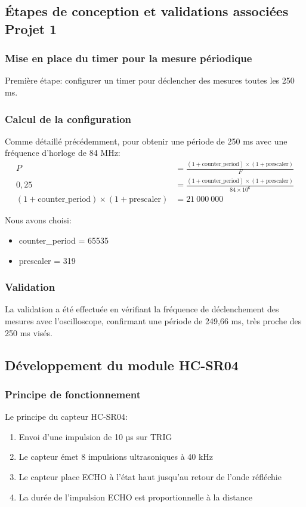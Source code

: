 \subsection{Étapes de conception et validations associées Projet 1}

\subsubsection{Mise en place du timer pour la mesure périodique}
Première étape: configurer un timer pour déclencher des mesures toutes les 250 ms.

\subsubsection{Calcul de la configuration}
Comme détaillé précédemment, pour obtenir une période de 250 ms avec une fréquence d'horloge de 84 MHz:
\begin{align*}
P &= \frac{(1 + \text{counter\_period}) \times (1 + \text{prescaler})}{F} \\
0,25 &= \frac{(1 + \text{counter\_period}) \times (1 + \text{prescaler})}{84 \times 10^6} \\
(1 + \text{counter\_period}) \times (1 + \text{prescaler}) &= 21~000~000
\end{align*}

Nous avons choisi:
\begin{itemize}
    \item counter\_period = 65535
    \item prescaler = 319
\end{itemize}

\subsubsection{Validation}
La validation a été effectuée en vérifiant la fréquence de déclenchement des mesures avec l'oscilloscope, confirmant une période de 249,66 ms, très proche des 250 ms visés.

\subsection{Développement du module HC-SR04}
\subsubsection{Principe de fonctionnement}
Le principe du capteur HC-SR04:
\begin{enumerate}
    \item Envoi d'une impulsion de 10 µs sur TRIG
    \item Le capteur émet 8 impulsions ultrasoniques à 40 kHz
    \item Le capteur place ECHO à l'état haut jusqu'au retour de l'onde réfléchie
    \item La durée de l'impulsion ECHO est proportionnelle à la distance
\end{enumerate}

